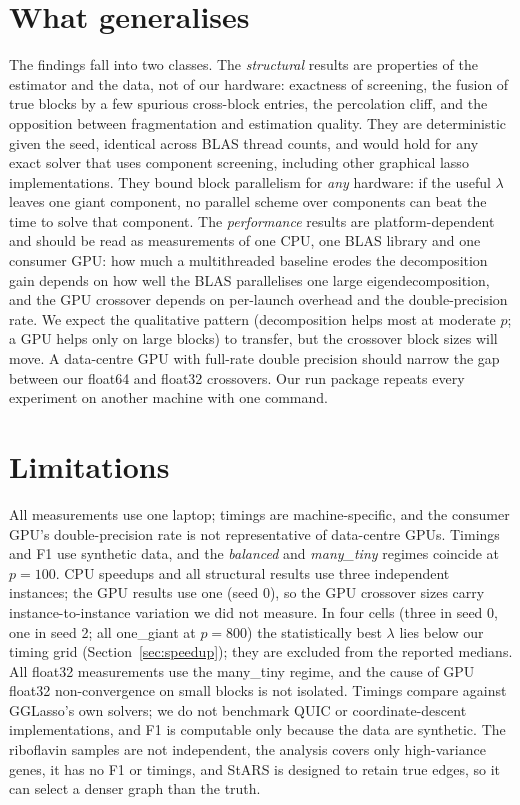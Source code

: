 \documentclass[pdflatex,sn-mathphys-num]{sn-jnl}
\begin{document}
\section{What generalises}
The findings fall into two classes. The \emph{structural} results are
properties of the estimator and the data, not of our hardware: exactness of
screening, the fusion of true blocks by a few spurious cross-block entries,
the percolation cliff, and the opposition between fragmentation and
estimation quality. They are deterministic given the seed, identical across
BLAS thread counts, and would hold for any exact solver that uses component
screening, including other graphical lasso implementations. They bound
block parallelism for \emph{any} hardware: if the useful $\lambda$ leaves one
giant component, no parallel scheme over components can beat the time to
solve that component.
The \emph{performance} results are platform-dependent and should be read as
measurements of one CPU, one BLAS library and one consumer GPU: how much a
multithreaded baseline erodes the decomposition gain depends on how well the
BLAS parallelises one large eigendecomposition, and the GPU crossover depends
on per-launch overhead and the double-precision rate. We expect the
qualitative pattern (decomposition helps most at moderate $p$; a GPU helps
only on large blocks) to transfer, but the crossover block sizes will move.
A data-centre GPU with full-rate double precision should narrow the gap
between our float64 and float32 crossovers. Our run package repeats every
experiment on another machine with one command.
\section{Limitations}
All measurements use one laptop; timings are machine-specific, and the
consumer GPU's double-precision rate is not representative of data-centre
GPUs. Timings and F1 use synthetic data, and the \emph{balanced} and \emph{many\_tiny}
regimes coincide at $p=100$.
CPU speedups and all structural results use three
independent instances; the GPU results use one (seed 0), so the GPU crossover
sizes carry instance-to-instance variation we did not measure. In four cells (three in seed 0, one in seed 2; all one\_giant at $p=800$)
the statistically best $\lambda$ lies below our timing grid
(Section~\ref{sec:speedup}); they are excluded from the reported medians. All float32 measurements use the many\_tiny regime, and the cause of GPU
float32 non-convergence on small blocks is not isolated. Timings compare against GGLasso's own
solvers; we do not benchmark QUIC or coordinate-descent implementations, and
F1 is computable only because the data are synthetic. The riboflavin samples
are not independent, the analysis covers only high-variance genes, it has no
F1 or timings, and StARS is designed to retain true edges, so it can select a
denser graph than the truth.
\end{document}
